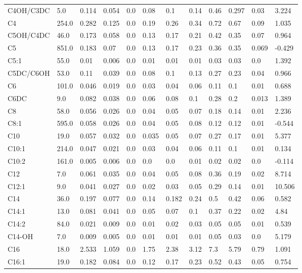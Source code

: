 \begin{tabular}{llllllllllll}
C4OH/C3DC & 5.0 & 0.114 & 0.054 & 0.0 & 0.08 & 0.1 & 0.14 & 0.46 & 0.297 & 0.03 & 3.224 \\
C4 & 254.0 & 0.282 & 0.125 & 0.0 & 0.19 & 0.26 & 0.34 & 0.72 & 0.67 & 0.09 & 1.035 \\
C5OH/C4DC & 46.0 & 0.173 & 0.058 & 0.0 & 0.13 & 0.17 & 0.21 & 0.42 & 0.35 & 0.07 & 0.964 \\
C5 & 851.0 & 0.183 & 0.07 & 0.0 & 0.13 & 0.17 & 0.23 & 0.36 & 0.35 & 0.069 & -0.429 \\
C5:1 & 55.0 & 0.01 & 0.006 & 0.0 & 0.01 & 0.01 & 0.01 & 0.03 & 0.03 & 0.0 & 1.392 \\
C5DC/C6OH & 53.0 & 0.11 & 0.039 & 0.0 & 0.08 & 0.1 & 0.13 & 0.27 & 0.23 & 0.04 & 0.966 \\
C6 & 101.0 & 0.046 & 0.019 & 0.0 & 0.03 & 0.04 & 0.06 & 0.11 & 0.1 & 0.01 & 0.688 \\
C6DC & 9.0 & 0.082 & 0.038 & 0.0 & 0.06 & 0.08 & 0.1 & 0.28 & 0.2 & 0.013 & 1.389 \\
C8 & 58.0 & 0.056 & 0.026 & 0.0 & 0.04 & 0.05 & 0.07 & 0.18 & 0.14 & 0.01 & 2.236 \\
C8:1 & 595.0 & 0.058 & 0.026 & 0.0 & 0.04 & 0.05 & 0.08 & 0.12 & 0.12 & 0.01 & -0.544 \\
C10 & 19.0 & 0.057 & 0.032 & 0.0 & 0.035 & 0.05 & 0.07 & 0.27 & 0.17 & 0.01 & 5.377 \\
C10:1 & 214.0 & 0.047 & 0.021 & 0.0 & 0.03 & 0.04 & 0.06 & 0.11 & 0.1 & 0.01 & 0.134 \\
C10:2 & 161.0 & 0.005 & 0.006 & 0.0 & 0.0 & 0.0 & 0.01 & 0.02 & 0.02 & 0.0 & -0.114 \\
C12 & 7.0 & 0.061 & 0.035 & 0.0 & 0.04 & 0.05 & 0.08 & 0.36 & 0.19 & 0.02 & 8.714 \\
C12:1 & 9.0 & 0.041 & 0.027 & 0.0 & 0.02 & 0.03 & 0.05 & 0.29 & 0.14 & 0.01 & 10.506 \\
C14 & 36.0 & 0.197 & 0.077 & 0.0 & 0.14 & 0.182 & 0.24 & 0.5 & 0.42 & 0.06 & 0.582 \\
C14:1 & 13.0 & 0.081 & 0.041 & 0.0 & 0.05 & 0.07 & 0.1 & 0.37 & 0.22 & 0.02 & 4.84 \\
C14:2 & 84.0 & 0.021 & 0.009 & 0.0 & 0.01 & 0.02 & 0.03 & 0.05 & 0.05 & 0.01 & 0.539 \\
C14-OH & 7.0 & 0.009 & 0.005 & 0.0 & 0.01 & 0.01 & 0.01 & 0.05 & 0.03 & 0.0 & 5.179 \\
C16 & 18.0 & 2.533 & 1.059 & 0.0 & 1.75 & 2.38 & 3.12 & 7.3 & 5.79 & 0.79 & 1.091 \\
C16:1 & 19.0 & 0.182 & 0.084 & 0.0 & 0.12 & 0.17 & 0.23 & 0.52 & 0.43 & 0.05 & 0.754 \\

\end{tabular}
